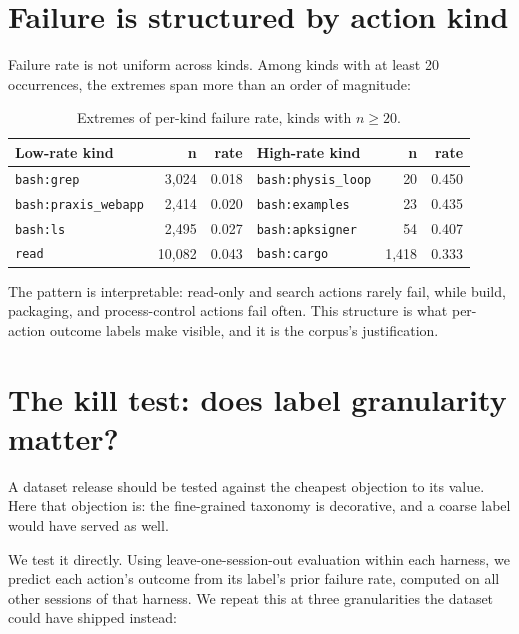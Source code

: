 \documentclass[11pt]{article}
\begin{document}
\section{Failure is structured by action kind}

Failure rate is not uniform across kinds. Among kinds with at least 20
occurrences, the extremes span more than an order of magnitude:

\begin{table}[h]
\centering
\begin{tabular}{lrr@{\hskip 2em}lrr}
\toprule
\textbf{Low-rate kind} & \textbf{n} & \textbf{rate} &
\textbf{High-rate kind} & \textbf{n} & \textbf{rate} \\
\midrule
\texttt{bash:grep}       & 3,024 & 0.018 & \texttt{bash:physis\_loop} & 20 & 0.450 \\
\texttt{bash:praxis\_webapp} & 2,414 & 0.020 & \texttt{bash:examples} & 23 & 0.435 \\
\texttt{bash:ls}         & 2,495 & 0.027 & \texttt{bash:apksigner} & 54 & 0.407 \\
\texttt{read}            & 10,082 & 0.043 & \texttt{bash:cargo} & 1,418 & 0.333 \\
\bottomrule
\end{tabular}
\caption{Extremes of per-kind failure rate, kinds with $n \ge 20$.}
\label{tab:extremes}
\end{table}

The pattern is interpretable: read-only and search actions rarely fail,
while build, packaging, and process-control actions fail often. This
structure is what per-action outcome labels make visible, and it is the
corpus's justification.

\section{The kill test: does label granularity matter?}
\label{sec:killtest}
\label{sec:kill}

A dataset release should be tested against the cheapest objection to its
value. Here that objection is: the fine-grained taxonomy is decorative,
and a coarse label would have served as well.

We test it directly. Using leave-one-session-out evaluation within each
harness, we predict each action's outcome from its label's prior failure
rate, computed on all other sessions of that harness. We repeat this at
three granularities the dataset could have shipped instead:
\end{document}
